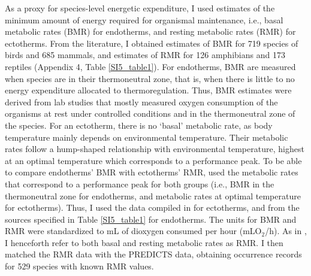 As a proxy for species-level energetic expenditure, I used estimates of the minimum amount of energy required for organismal maintenance, i.e., basal metabolic rates (BMR) for endotherms, and resting metabolic rates (RMR) for ectotherms. From the literature, I obtained estimates of BMR for 719 species of birds and 685 mammals, and estimates of RMR for 126 amphibians and 173 reptiles (Appendix 4, Table \ref{SI5_table1}). For endotherms, BMR are measured when species are in their thermoneutral zone, that is, when there is little to no energy expenditure allocated to thermoregulation. Thus, BMR estimates were derived from lab studies that mostly measured oxygen consumption of the organisms at rest under controlled conditions and in the thermoneutral zone of the species. For an ectotherm, there is no `basal' metabolic rate, as body temperature mainly depends on environmental temperature. Their metabolic rates follow a hump-shaped relationship with environmental temperature, highest at an optimal temperature which corresponds to a performance peak. To be able to compare endotherms’ BMR with ectotherms’ RMR, \citet{Stark2020} used the metabolic rates that correspond to a performance peak for both groups (i.e., BMR in the thermoneutral zone for endotherms, and metabolic rates at optimal temperature for ectotherms). Thus, I used the data compiled in \citet{Stark2020} for ectotherms, and from the sources specified in Table \ref{SI5_table1} for endotherms. The units for BMR and RMR were standardized to mL of dioxygen consumed per hour (mLO$_2$/h). As in \citet{Stark2020}, I henceforth refer to both basal and resting metabolic rates as RMR. I then matched the RMR data with the PREDICTS data, obtaining occurrence records for 529 species with known RMR values.


